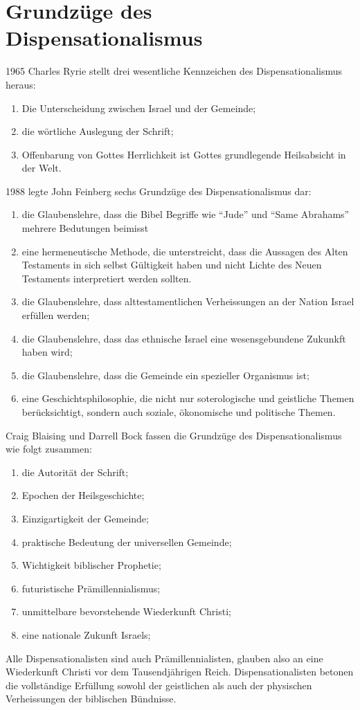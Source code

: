 \documentclass{../../inc/mybib}
\begin{document}
\section{Grundzüge des Dispensationalismus}
1965 Charles Ryrie stellt drei wesentliche Kennzeichen des Dispensationalismus heraus:
\begin{enumerate}
    \item Die Unterscheidung zwischen Israel und der Gemeinde;
    \item die wörtliche Auslegung der Schrift;
    \item Offenbarung von Gottes Herrlichkeit ist Gottes grundlegende Heilsabsicht in der Welt.
\end{enumerate}
1988 legte John Feinberg sechs Grundzüge des Dispensationalismus dar:
\begin{enumerate}
    \item die Glaubenslehre, dass die Bibel Begriffe wie \enquote{Jude} und \enquote{Same Abrahams} mehrere Bedutungen beimisst
    \item eine hermeneutische Methode, die unterstreicht, dass die Aussagen des Alten Testaments in sich selbst Gültigkeit haben und nicht Lichte des Neuen Testaments interpretiert werden sollten.
    \item die Glaubenslehre, dass alttestamentlichen Verheissungen an der Nation Israel erfüllen werden;
    \item die Glaubenslehre, dass das ethnische Israel eine wesensgebundene Zukunkft haben wird;
    \item die Glaubenslehre, dass die Gemeinde ein spezieller Organismus ist;
    \item eine Geschichtsphilosophie, die nicht nur soterologische und geistliche Themen berücksichtigt, sondern auch soziale, ökonomische und politische Themen.
\end{enumerate}
Craig Blaising und Darrell Bock fassen die Grundzüge des Dispensationalismus wie folgt zusammen:
\begin{enumerate}
    \item die Autorität der Schrift;
    \item Epochen der Heilsgeschichte;
    \item Einzigartigkeit der Gemeinde;
    \item praktische Bedeutung der universellen Gemeinde;
    \item Wichtigkeit biblischer Prophetie;
    \item futuristische Prämillennialismus;
    \item unmittelbare bevorstehende Wiederkunft Christi;
    \item eine nationale Zukunft Israels;
\end{enumerate}
Alle Dispensationalisten sind auch Prämillennialisten, glauben also an eine Wiederkunft Christi vor dem Tausendjährigen Reich. Dispensationalisten betonen die vollständige Erfüllung sowohl der geistlichen als auch der physischen Verheissungen der biblischen Bündnisse.
\end{document}
